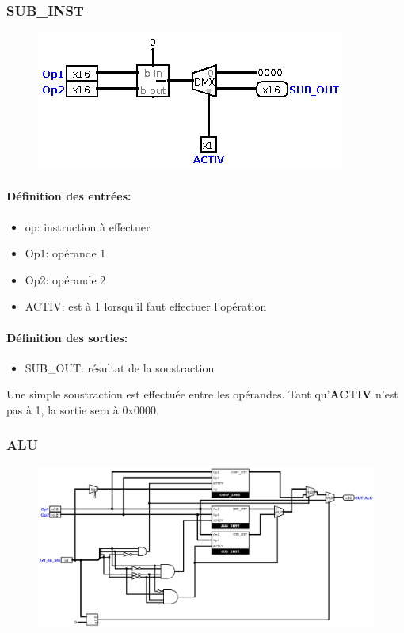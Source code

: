 \documentclass[a4paper]{article} %
\begin{document}
\subsubsection{SUB\_INST}
\begin{figure}[H]
    \centering
    \includegraphics[width=.8\textwidth]{src/SUB_INST.png}
    \label{fig:sub_inst_pic}
\end{figure}
\paragraph{Définition des entrées:}
\begin{itemize}
    \item     op: instruction à effectuer
    \item     Op1: opérande 1
    \item     Op2: opérande 2
    \item     ACTIV: est à 1 lorsqu'il faut effectuer l'opération
\end{itemize}

\paragraph{Définition des sorties:}
\begin{itemize}
    \item     SUB\_OUT: résultat de la soustraction
\end{itemize}
\medskip
Une simple soustraction est effectuée entre les opérandes. Tant qu'\textbf{ACTIV} n'est pas à 1, la sortie sera à 0x0000.

\subsubsection{ALU} \label{alu}
\begin{figure}[H]
    \centering
    \includegraphics[width=1\textwidth]{src/ALU.png}
    \label{fig:alu_pic}
\end{figure}
\end{document}
